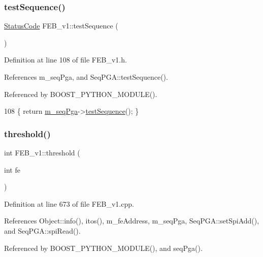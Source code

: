 \subsubsection{\texorpdfstring{test\+Sequence()}{testSequence()}}
{\footnotesize\ttfamily \hyperlink{classStatusCode}{Status\+Code} F\+E\+B\+\_\+v1\+::test\+Sequence (\begin{DoxyParamCaption}{ }\end{DoxyParamCaption})\hspace{0.3cm}{\ttfamily [inline]}}



Definition at line 108 of file F\+E\+B\+\_\+v1.\+h.



References m\+\_\+seq\+Pga, and Seq\+P\+G\+A\+::test\+Sequence().



Referenced by B\+O\+O\+S\+T\+\_\+\+P\+Y\+T\+H\+O\+N\+\_\+\+M\+O\+D\+U\+L\+E().


\begin{DoxyCode}
108 \{ \textcolor{keywordflow}{return} \hyperlink{classFEB__v1_a6c7804ac86796f233a8393043adf2e77}{m\_seqPga}->\hyperlink{classSeqPGA_a299f2826e5edba5636f0f41233683156}{testSequence}(); \}
\end{DoxyCode}
\mbox{\label{classFEB__v1_a71e54700c59857844905c879e4b3d4fd}} 
\subsubsection{\texorpdfstring{threshold()}{threshold()}}
{\footnotesize\ttfamily int F\+E\+B\+\_\+v1\+::threshold (\begin{DoxyParamCaption}\item[{int}]{fe }\end{DoxyParamCaption})}



Definition at line 673 of file F\+E\+B\+\_\+v1.\+cpp.



References Object\+::info(), itos(), m\+\_\+fe\+Address, m\+\_\+seq\+Pga, Seq\+P\+G\+A\+::set\+Spi\+Add(), and Seq\+P\+G\+A\+::spi\+Read().



Referenced by B\+O\+O\+S\+T\+\_\+\+P\+Y\+T\+H\+O\+N\+\_\+\+M\+O\+D\+U\+L\+E(), and seq\+Pga().


